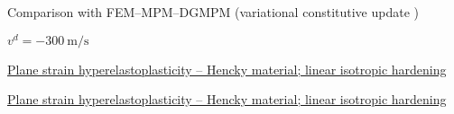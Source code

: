 
\begin{frame}
  \footnotesize Comparison with FEM--MPM--DGMPM (variational constitutive update \cite{LaurentVariational})
  \centering
  
  \footnotesize $v^d = -300 \: \text{m/s}$
  
\end{frame}

\begin{frame}{\href{section4/animation/hyperelastoplasticity/stress.mp4}{Plane strain hyperelastoplasticity -- Hencky material; linear isotropic hardening}}
  \begin{center}
  \end{center}
\end{frame}


\begin{frame}{\href{section4/animation/hyperelastoplasticity/epeq.mp4}{Plane strain hyperelastoplasticity -- Hencky material; linear isotropic hardening}}
  \begin{center}
  \end{center}
\end{frame}



\begin{frame}
  \begin{columns}
    \begin{column}{0.49\textwidth}
      
    \end{column}
    \begin{column}{0.49\textwidth}
      
    \end{column}
  \end{columns}
\end{frame}
